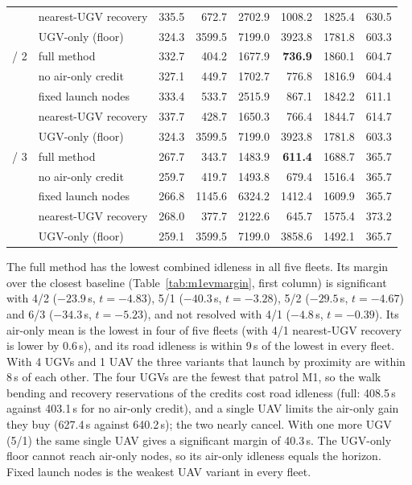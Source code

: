 \documentclass[11pt]{article}
\theoremstyle{definition}
\theoremstyle{plain}
\begin{document}
\begin{table}[H]
\begin{tabular}{llrrrrrr}
 & nearest-UGV recovery & 335.5 & 672.7 & 2702.9 & 1008.2 & 1825.4 & 630.5 \\
 & UGV-only (floor) & 324.3 & 3599.5 & 7199.0 & 3923.8 & 1781.8 & 603.3 \\
\addlinespace
5 / 2 & full method & 332.7 & 404.2 & 1677.9 & \textbf{736.9} & 1860.1 & 604.7 \\
 & no air-only credit & 327.1 & 449.7 & 1702.7 & 776.8 & 1816.9 & 604.4 \\
 & fixed launch nodes & 333.4 & 533.7 & 2515.9 & 867.1 & 1842.2 & 611.1 \\
 & nearest-UGV recovery & 337.7 & 428.7 & 1650.3 & 766.4 & 1844.7 & 614.7 \\
 & UGV-only (floor) & 324.3 & 3599.5 & 7199.0 & 3923.8 & 1781.8 & 603.3 \\
\addlinespace
6 / 3 & full method & 267.7 & 343.7 & 1483.9 & \textbf{611.4} & 1688.7 & 365.7 \\
 & no air-only credit & 259.7 & 419.7 & 1493.8 & 679.4 & 1516.4 & 365.7 \\
 & fixed launch nodes & 266.8 & 1145.6 & 6324.2 & 1412.4 & 1609.9 & 365.7 \\
 & nearest-UGV recovery & 268.0 & 377.7 & 2122.6 & 645.7 & 1575.4 & 373.2 \\
 & UGV-only (floor) & 259.1 & 3599.5 & 7199.0 & 3858.6 & 1492.1 & 365.7 \\
\bottomrule
\end{tabular}
\end{table}

The full method has the lowest combined idleness in all five fleets. Its
margin over the closest baseline (Table~\ref{tab:m1evmargin}, first column)
is significant with 4/2 ($-23.9$\,s, $t = -4.83$), 5/1 ($-40.3$\,s,
$t = -3.28$), 5/2 ($-29.5$\,s, $t = -4.67$) and 6/3 ($-34.3$\,s,
$t = -5.23$), and not resolved with 4/1 ($-4.8$\,s, $t = -0.39$). Its
air-only mean is the lowest in four of five fleets (with 4/1 nearest-UGV
recovery is lower by 0.6\,s), and its road idleness is within 9\,s of the
lowest in every fleet. With 4 UGVs and 1 UAV the three variants that
launch by proximity are within 8\,s of each other. The four UGVs are the
fewest that patrol M1, so the walk bending and recovery reservations of the
credits cost road idleness (full: 408.5\,s against 403.1\,s for no air-only
credit), and a single UAV limits the air-only gain they buy (627.4\,s
against 640.2\,s); the two nearly cancel. With one more UGV (5/1) the same
single UAV gives a significant margin of 40.3\,s. The UGV-only floor cannot reach
air-only nodes, so its air-only idleness equals the horizon. Fixed launch
nodes is the weakest UAV variant in every fleet.
\end{document}
